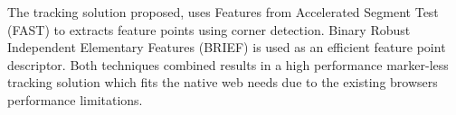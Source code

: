The tracking solution proposed, uses Features from Accelerated Segment Test (FAST) \cite{Rosten2010} to extracts feature points using corner detection. Binary Robust Independent Elementary Features (BRIEF) \cite{Calonder2010} is used as an efficient feature point descriptor. Both techniques combined results in a high performance marker-less tracking solution which fits the native web needs due to the existing browsers performance limitations.



